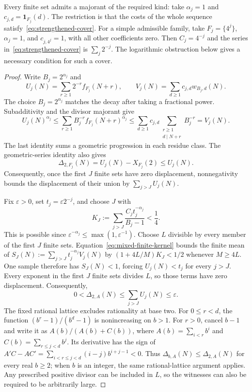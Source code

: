 \documentclass[11pt]{article}
\begin{document}
Every finite set admits a majorant of the required kind: take
$\alpha_j=1$ and $c_{j,d}=\mathbf1_{F_j}(d)$.  The restriction is that
the costs of the whole sequence satisfy~\eqref{eq:strengthened-cover}.
For a simple admissible family, take $F_j=\{4^j\}$, $\alpha_j=1$, and
$c_{j,4^j}=1$, with all other coefficients zero.  Then $C_j=4^{-j}$ and
the series in~\eqref{eq:strengthened-cover} is $\sum_j2^{-j}$.
The logarithmic obstruction below gives a necessary condition for such a
cover.

\begin{proof}
Write $B_j=2^{\alpha_j}$ and
\[
 U_j(N)=\sum_{r\ge1}2^{-r}f_{F_j}(N+r),\qquad
 V_j(N)=\sum_{d\ge1}c_{j,d}w_{B_j,d}(N).
\]
The choice $B_j=2^{\alpha_j}$ matches the decay after taking a
fractional power.  Subadditivity and the divisor majorant give
\[
 U_j(N)^{\alpha_j}
 \le\sum_{r\ge1}B_j^{-r}f_{F_j}(N+r)^{\alpha_j}
 \le\sum_{d\ge1}c_{j,d}
       \sum_{\substack{r\ge1\\d\mid N+r}}B_j^{-r}
 =V_j(N).
\]
The last identity sums a geometric progression in each residue class.
The geometric-series identity also gives
\[
 \Delta_{2,F_j}(N)=U_j(N)-X_{F_j}(2)\le U_j(N).
\]
Consequently, once the first $J$ finite sets have zero displacement, nonnegativity
bounds the displacement of their union by $\sum_{j>J}U_j(N)$.

Fix $\varepsilon>0$, set $t_j=\varepsilon2^{-j}$, and choose $J$ with
\[
 K_J:=\sum_{j>J}\frac{C_jt_j^{-\alpha_j}}{B_j-1}<\frac14.
\]
This is possible since $\varepsilon^{-\alpha_j}\le\max(1,\varepsilon^{-1})$.
Choose $L$ divisible by every member of the first $J$ finite sets.  Equation~\eqref{eq:mixed-finite-kernel} bounds the finite mean of
$S_J(N):=\sum_{j>J}t_j^{-\alpha_j}V_j(N)$ by
$(1+4L/M)K_J<1/2$ whenever $M\ge4L$.
One sample therefore has $S_J(N)<1$, forcing $U_j(N)<t_j$ for every $j>J$.
Every exponent in the first $J$ finite sets divides $L$, so those terms
have zero displacement.  Consequently,
\[
 0<\Delta_{2,A}(N)\le\sum_{j>J}U_j(N)\le\varepsilon.
\]
The fixed rational lattice excludes rationality at base two.
For $0\le r<d$, the function $(b^r-1)/(b^d-1)$ is nonincreasing
on $b>1$.  For $r>0$, cancel $b-1$ and write it as
$A(b)/(A(b)+C(b))$, where $A(b)=\sum_{i<r}b^i$ and
$C(b)=\sum_{r\le j<d}b^j$.  Its derivative has the sign of
$A'C-AC'=\sum_{i<r\le j<d}(i-j)b^{i+j-1}<0$.
Thus $\Delta_{b,A}(N)\le\Delta_{2,A}(N)$ for every real $b\ge2$;
when $b$ is an integer, the same rational-lattice argument applies.
Any prescribed positive divisor can be included in $L$, so the witnesses
can also be required to be arbitrarily large.
\end{proof}
\end{document}
